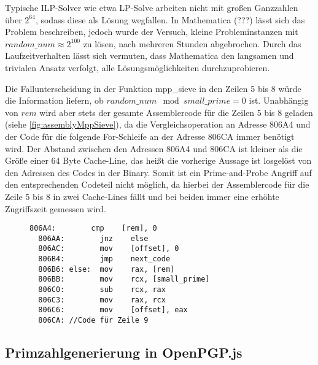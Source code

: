 Typische ILP-Solver wie etwa LP-Solve arbeiten nicht mit großen Ganzzahlen über $2^64$, sodass diese als Lösung wegfallen.
In Mathematica (???) lässt sich das Problem beschreiben, jedoch wurde der Versuch, kleine Probleminstanzen mit $random\_num \approx 2^100$ zu lösen, nach mehreren Stunden abgebrochen.
Durch das Laufzeitverhalten lässt sich vermuten, dass Mathematica den langsamen und trivialen Ansatz verfolgt, alle Lösungsmöglichkeiten durchzuprobieren.

Die Fallunterscheidung in der Funktion mpp_sieve in den Zeilen 5 bis 8 würde die Information liefern, ob $random\_num \mod small\_prime = 0$ ist.
Unabhängig von $rem$ wird aber stets der gesamte Assemblercode für die Zeilen 5 bis 8 geladen (siehe \ref{fig:assemblyMppSieve}), da die Vergleichsoperation an Adresse 806A4 und der Code für die folgende For-Schleife an der Adresse 806CA immer benötigt wird.
Der Abstand zwischen den Adressen 806A4 und 806CA ist kleiner als die Größe einer 64 Byte Cache-Line, das heißt die vorherige Aussage ist losgelöst von den Adressen des Codes in der Binary.
Somit ist ein Prime-and-Probe Angriff auf den entsprechenden Codeteil nicht möglich, da hierbei der Assemblercode für die Zeile 5 bis 8 in zwei Cache-Lines fällt und bei beiden immer eine erhöhte Zugriffszeit gemessen wird.

\begin{figure}[h]
\begin{lstlisting}[caption={Assemblercode für die Zeilen 5 bis 8 der Funktion mpp_sieve, welche Teile des Codes der RSA-Primzahlgenerierung für Mozilla NSS ist.},label=fig:assemblyMppSieve]
  806A4:        cmp    [rem], 0
  806AA:        jnz    else
  806AC:        mov    [offset], 0  
  806B4:        jmp    next_code
  806B6: else:  mov    rax, [rem]
  806BB:        mov    rcx, [small_prime]
  806C0:        sub    rcx, rax
  806C3:        mov    rax, rcx
  806C6:        mov    [offset], eax
  806CA: //Code für Zeile 9
\end{lstlisting}
\end{figure}

\subsection{Primzahlgenerierung in OpenPGP.js}


